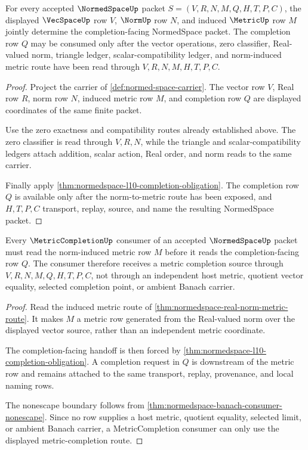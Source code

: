 \begin{theorem}
\label{thm:normedspace-completion-triad}
For every accepted $\NormedSpaceUp$ packet $S=(V,R,N,M,Q,H,T,P,C)$, the displayed $\VecSpaceUp$ row $V$, $\NormUp$ row $N$, and induced $\MetricUp$ row $M$ jointly determine the completion-facing NormedSpace packet. The completion row $Q$ may be consumed only after the vector operations, zero classifier, Real-valued norm, triangle ledger, scalar-compatibility ledger, and norm-induced metric route have been read through $V,R,N,M,H,T,P,C$.
\end{theorem}
\begin{proof}
Project the carrier of \autoref{def:normed-space-carrier}. The vector row $V$, Real row $R$, norm row $N$, induced metric row $M$, and completion row $Q$ are displayed coordinates of the same finite packet.

Use the zero exactness and compatibility routes already established above. The zero classifier is read through $V,R,N$, while the triangle and scalar-compatibility ledgers attach addition, scalar action, Real order, and norm reads to the same carrier.

Finally apply \autoref{thm:normedspace-l10-completion-obligation}. The completion row $Q$ is available only after the norm-to-metric route has been exposed, and $H,T,P,C$ transport, replay, source, and name the resulting NormedSpace packet.
\end{proof}

\begin{theorem}
\label{thm:normedspace-metric-completion-unblock}
Every $\MetricCompletionUp$ consumer of an accepted $\NormedSpaceUp$ packet must read the norm-induced metric row $M$ before it reads the completion-facing row $Q$. The consumer therefore receives a metric completion source through $V,R,N,M,Q,H,T,P,C$, not through an independent host metric, quotient vector equality, selected completion point, or ambient Banach carrier.
\end{theorem}
\begin{proof}
Read the induced metric route of \autoref{thm:normedspace-real-norm-metric-route}. It makes $M$ a metric row generated from the Real-valued norm over the displayed vector source, rather than an independent metric coordinate.

The completion-facing handoff is then forced by \autoref{thm:normedspace-l10-completion-obligation}. A completion request in $Q$ is downstream of the metric row and remains attached to the same transport, replay, provenance, and local naming rows.

The nonescape boundary follows from \autoref{thm:normedspace-banach-consumer-nonescape}. Since no row supplies a host metric, quotient equality, selected limit, or ambient Banach carrier, a MetricCompletion consumer can only use the displayed metric-completion route.
\end{proof}

